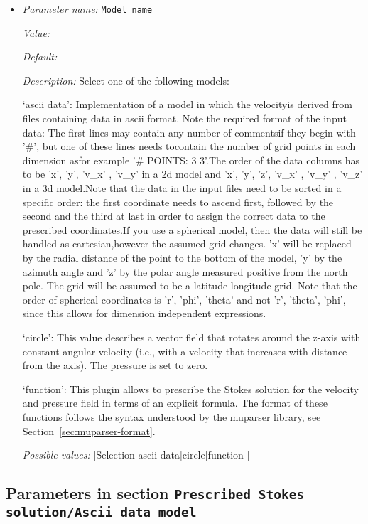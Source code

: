 \begin{itemize}
\item {\it Parameter name:} {\tt Model name}
\label{parameters:Prescribed Stokes solution/Model name}


{\it Value:} 


{\it Default:} 


{\it Description:} Select one of the following models:

`ascii data': Implementation of a model in which the velocityis derived from files containing data in ascii format. Note the required format of the input data: The first lines may contain any number of commentsif they begin with '#', but one of these lines needs tocontain the number of grid points in each dimension asfor example '# POINTS: 3 3'.The order of the data columns has to be 'x', 'y', 'v_x' , 'v_y' in a 2d model and  'x', 'y', 'z', 'v_x' , 'v_y' , 'v_z' in a 3d model.Note that the data in the input files need to be sorted in a specific order: the first coordinate needs to ascend first, followed by the second and the third at last in order to assign the correct data to the prescribed coordinates.If you use a spherical model, then the data will still be handled as cartesian,however the assumed grid changes. 'x' will be replaced by the radial distance of the point to the bottom of the model, 'y' by the azimuth angle and 'z' by the polar angle measured positive from the north pole. The grid will be assumed to be a latitude-longitude grid. Note that the order of spherical coordinates is 'r', 'phi', 'theta' and not 'r', 'theta', 'phi', since this allows for dimension independent expressions. 

`circle': This value describes a vector field that rotates around the z-axis with constant angular velocity (i.e., with a velocity that increases with distance from the axis). The pressure is set to zero.

`function': This plugin allows to prescribe the Stokes solution for the velocity and pressure field in terms of an explicit formula. The format of these functions follows the syntax understood by the muparser library, see Section~\ref{sec:muparser-format}.


{\it Possible values:} [Selection ascii data|circle|function ]
\end{itemize}



\subsection{Parameters in section \tt Prescribed Stokes solution/Ascii data model}
\label{parameters:Prescribed_20Stokes_20solution/Ascii_20data_20model}

